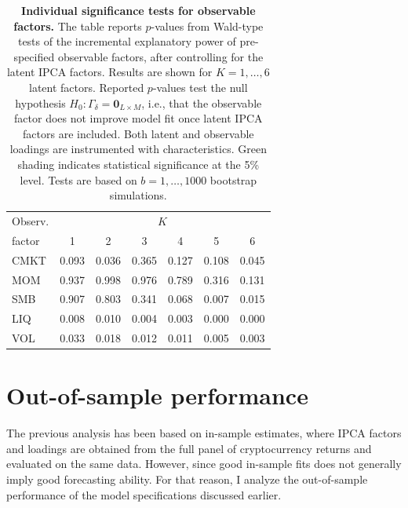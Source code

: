 \documentclass[
  12pt,
  a4paper,
  openany]{scrbook}
\begin{document}
\begin{table}
\centering
\small
\caption[Individual significance tests for observable factors]%
{%
\textbf{Individual significance tests for observable factors.}
The table reports $p$-values from Wald-type tests of the incremental explanatory power of pre-specified observable factors, after controlling for the latent IPCA factors. Results are shown for $K=1,\dots,6$ latent factors. Reported $p$-values test the null hypothesis $H_0:\Gamma_\delta = \mathbf{0}_{L \times M}$, i.e., that the observable factor does not improve model fit once latent IPCA factors are included. Both latent and observable loadings are instrumented with characteristics. Green shading indicates statistical significance at the 5\% level. Tests are based on $b = 1, \dots, 1000$ bootstrap simulations.
}
\label{tbl-delta-test}
\vspace{5pt} %
\begin{tabular}{lcccccc}
\toprule
\multicolumn{1}{c}{Observ.} & \multicolumn{6}{c}{$K$} \\
\cmidrule(lr){2-7}
factor & 1 & 2 & 3 & 4 & 5 & 6 \\
\midrule
CMKT & 0.093 & \cellcolor{green!20}0.036 & 0.365 & 0.127 & 0.108 & \cellcolor{green!20}0.045 \\
MOM  & 0.937 & 0.998 & 0.976 & 0.789 & 0.316 & 0.131 \\
SMB & 0.907 & 0.803 & 0.341 & 0.068 & \cellcolor{green!20}0.007 & \cellcolor{green!20}0.015 \\
LIQ  & \cellcolor{green!20}0.008 & \cellcolor{green!20}0.010 & \cellcolor{green!20}0.004 & \cellcolor{green!20}0.003 & \cellcolor{green!20}0.000 & \cellcolor{green!20}0.000 \\
VOL  & \cellcolor{green!20}0.033 & \cellcolor{green!20}0.018 & \cellcolor{green!20}0.012 & \cellcolor{green!20}0.011 & \cellcolor{green!20}0.005 & \cellcolor{green!20}0.003 \\
\bottomrule
\end{tabular}
\end{table}

\section{Out-of-sample performance}\label{out-of-sample-performance}

The previous analysis has been based on in-sample estimates, where IPCA
factors and loadings are obtained from the full panel of cryptocurrency
returns and evaluated on the same data. However, since good in-sample
fits does not generally imply good forecasting ability. For that reason,
I analyze the out-of-sample performance of the model specifications
discussed earlier.
\end{document}
